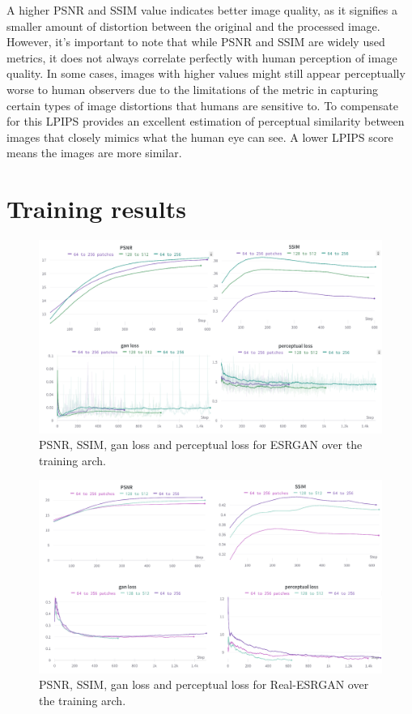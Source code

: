 A higher PSNR and SSIM value indicates better image quality, as it signifies a smaller amount of distortion between the original and the processed image. However, it's important to note that while PSNR and SSIM are widely used metrics, it does not always correlate perfectly with human perception of image quality. In some cases, images with higher values might still appear perceptually worse to human observers due to the limitations of the metric in capturing certain types of image distortions that humans are sensitive to. To compensate for this LPIPS provides an excellent estimation of perceptual similarity between images that closely mimics what the human eye can see. A lower LPIPS score means the images are more similar.

\section{Training results}
\label{sec:training_res}

\begin{figure}[H]
  \centering
  \includegraphics[scale=0.8]{figures/ESRGAN_compose.png}
  \caption{PSNR, SSIM, gan loss and perceptual loss for ESRGAN over the training arch.}
  \label{img:esrgan_training}
\end{figure}

\begin{figure}[H]
  \centering
  \includegraphics[scale=0.8]{figures/RealESRGAN_compose.png}
  \caption{PSNR, SSIM, gan loss and perceptual loss for Real-ESRGAN over the training arch.}
  \label{img:realesrgan_training}
\end{figure}

